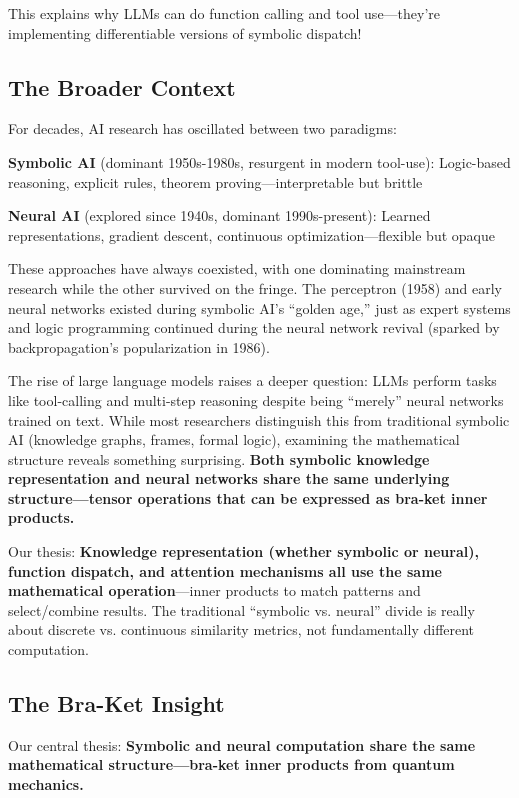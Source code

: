 \documentclass[11pt,a4paper]{article}
\theoremstyle{definition}
\begin{document}
This explains why LLMs can do function calling and tool use---they're implementing differentiable versions of symbolic dispatch!

\subsection{The Broader Context}

For decades, AI research has oscillated between two paradigms:

\textbf{Symbolic AI} (dominant 1950s-1980s, resurgent in modern tool-use): Logic-based reasoning, explicit rules, theorem proving---interpretable but brittle

\textbf{Neural AI} (explored since 1940s, dominant 1990s-present): Learned representations, gradient descent, continuous optimization---flexible but opaque

These approaches have always coexisted, with one dominating mainstream research while the other survived on the fringe. The perceptron (1958) and early neural networks existed during symbolic AI's ``golden age,'' just as expert systems and logic programming continued during the neural network revival (sparked by backpropagation's popularization in 1986).

The rise of large language models raises a deeper question: LLMs perform tasks like tool-calling and multi-step reasoning despite being ``merely'' neural networks trained on text. While most researchers distinguish this from traditional symbolic AI (knowledge graphs, frames, formal logic), examining the mathematical structure reveals something surprising. \textbf{Both symbolic knowledge representation and neural networks share the same underlying structure---tensor operations that can be expressed as bra-ket inner products.}

Our thesis: \textbf{Knowledge representation (whether symbolic or neural), function dispatch, and attention mechanisms all use the same mathematical operation}---inner products to match patterns and select/combine results. The traditional ``symbolic vs. neural'' divide is really about discrete vs. continuous similarity metrics, not fundamentally different computation.

\subsection{The Bra-Ket Insight}

Our central thesis: \textbf{Symbolic and neural computation share the same mathematical structure---bra-ket inner products from quantum mechanics.}
\end{document}
